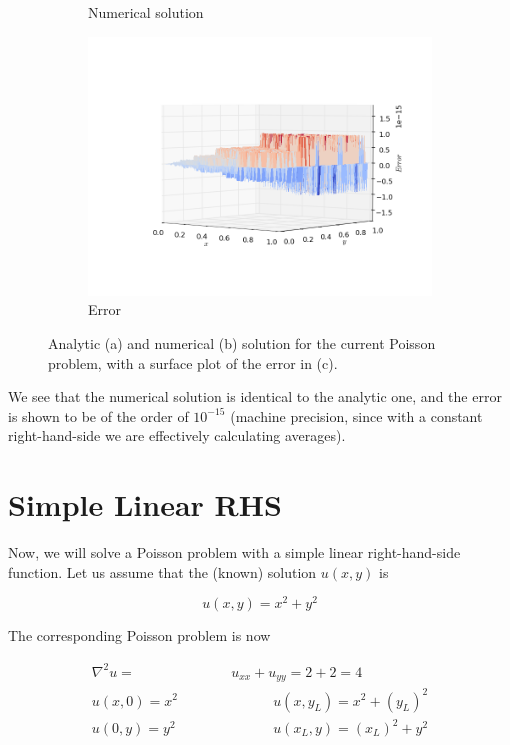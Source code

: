 \documentclass[11pt]{report}
\begin{document}
\begin{figure}[h!]
\begin{subfigure}{0.5\textwidth}
  \caption{Numerical solution}
  \label{fig:sub2}
\end{subfigure}
\begin{subfigure}{0.6\textwidth}
  \centering
  \includegraphics[width=1.0\linewidth]{images/example1_error}
  \caption{Error}
  \label{fig:sub2}
\end{subfigure}
\caption{Analytic (a) and numerical (b) solution for the current Poisson problem, with a surface plot of the  error in (c).}
\label{fig:example1}
\end{figure}

We see that the numerical solution is identical to the analytic one, and the error is shown to be of the order of $10^{-15}$ (machine precision, since with a constant right-hand-side we are effectively calculating averages). 

\section{Simple Linear RHS}
Now, we will solve a Poisson problem with a simple linear right-hand-side function. Let us assume that the (known) solution $u(x,y)$ is 

\begin{equation}
u(x,y) = x^2 + y^2
\end{equation}

The corresponding Poisson problem is now

\begin{subequations}
\begin{align}
\nabla ^2 u = &u_{xx} + u_{yy} = 2 + 2 = 4 \\
u(x,0) = x^2 \quad \quad \quad & \quad \quad \quad u(x,y_L) = x^2 + (y_L)^2 \\
u(0,y) = y^2 \quad \quad \quad & \quad \quad \quad u(x_L,y) = (x_L)^2 + y^2
\end{align}
\end{subequations}
\end{document}

